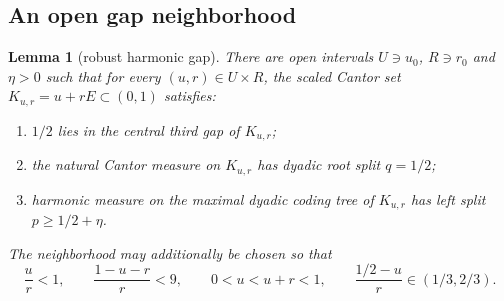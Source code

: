 \documentclass[11pt]{article}
\newtheorem{lemma}[theorem]{Lemma}
\theoremstyle{remark}
\begin{document}
\subsection{An open gap neighborhood}

\begin{lemma}[robust harmonic gap]\label{lem:robust-gap}
There are open intervals $U\ni u_0$, $R\ni r_0$ and $\eta>0$ such that for every $(u,r)\in U\times R$, the scaled Cantor set $K_{u,r}=u+rE\subset(0,1)$ satisfies:
\begin{enumerate}
\item $1/2$ lies in the central third gap of $K_{u,r}$;
\item the natural Cantor measure on $K_{u,r}$ has dyadic root split $q=1/2$;
\item harmonic measure on the maximal dyadic coding tree of $K_{u,r}$ has left split $p\ge1/2+\eta$.
\end{enumerate}
The neighborhood may additionally be chosen so that
\begin{equation}\label{eq:margins-neigh}
 \frac ur<1,\qquad \frac{1-u-r}{r}<9,
 \qquad 0<u<u+r<1,
 \qquad \frac{1/2-u}{r}\in(1/3,2/3).
\end{equation}
\end{lemma}
\end{document}
